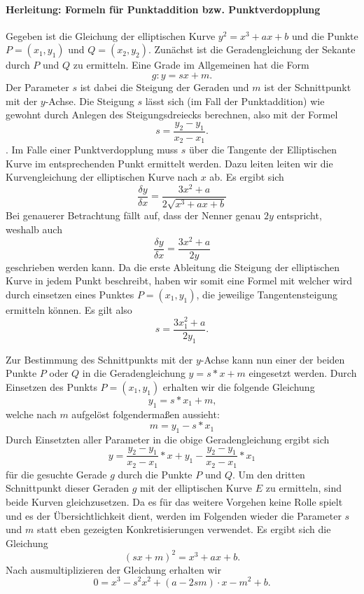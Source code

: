\paragraph{Herleitung: Formeln für Punktaddition bzw. Punktverdopplung}
Gegeben ist die Gleichung der elliptischen Kurve $y^2 = x^3 +ax + b$ und die Punkte $P = (x_1, y_1)$ und $Q = (x_2, y_2)$. Zunächst ist die Geradengleichung der Sekante durch $P$ und $Q$ zu ermitteln. Eine Grade im Allgemeinen hat die Form $$g: y = sx + m.$$ Der Parameter $s$ ist dabei die Steigung der Geraden und $m$ ist der Schnittpunkt mit der $y$-Achse. Die Steigung $s$ lässt sich (im Fall der Punktaddition) wie gewohnt durch Anlegen des Steigungsdreiecks berechnen, also mit der Formel $$s = \frac{y_2 - y_1}{x_2  - x_1}.$$. Im Falle einer Punktverdopplung muss $s$ über die Tangente der Elliptischen Kurve im entsprechenden Punkt ermittelt werden. Dazu leiten leiten wir die Kurvengleichung der elliptischen Kurve nach $x$ ab. Es ergibt sich $$\frac{\delta y}{\delta x} = \frac{3x^2 + a}{2 \sqrt{x^3 + ax + b}}$$ Bei genauerer Betrachtung fällt auf, dass der Nenner genau $2y$ entspricht, weshalb auch $$\frac{\delta y}{\delta x} = \frac{3x^2 + a}{2y}$$ geschrieben werden kann. Da die erste Ableitung die Steigung der elliptischen Kurve in jedem Punkt beschreibt, haben wir somit eine Formel mit welcher wird durch einsetzen eines Punktes $P = (x_1, y_1)$, die jeweilige Tangentensteigung ermitteln können. Es gilt also $$s = \frac{3x_1^2 + a}{2y_1}\text{.}$$

Zur Bestimmung des Schnittpunkts mit der $y$-Achse kann nun einer der beiden Punkte $P$ oder $Q$ in die Geradengleichung $y = s * x + m$ eingesetzt werden. Durch Einsetzen des Punkts $P = (x_1, y_1)$  erhalten wir die folgende Gleichung $$y_1 = s * x_1 + m\text{,}$$ welche nach $m$ aufgelöst folgendermaßen aussieht: $$m = y_1 - s * x_1$$
Durch Einsetzten aller Parameter in die obige Geradengleichung ergibt sich $$y = \frac{y_2 - y_1}{x_2  - x_1} * x + y_1 - \frac{y_2 - y_1}{x_2  - x_1} * x_1$$ für die gesuchte Gerade $g$ durch die Punkte $P$ und $Q$. Um den dritten Schnittpunkt dieser Geraden $g$ mit der elliptischen Kurve $E$ zu ermitteln, sind beide Kurven gleichzusetzen. Da es für das weitere Vorgehen keine Rolle spielt und es der Übersichtlichkeit dient, werden im Folgenden wieder die Parameter $s$ und $m$ statt eben gezeigten Konkretisierungen verwendet. Es ergibt sich die Gleichung $$(sx+m)^2 = x^3 + ax + b\text{.}$$ Nach ausmultiplizieren der Gleichung erhalten wir $$0 =  x^3 - s^2x^2 + (a-2sm)\cdot x - m^2+b \text{.}$$

